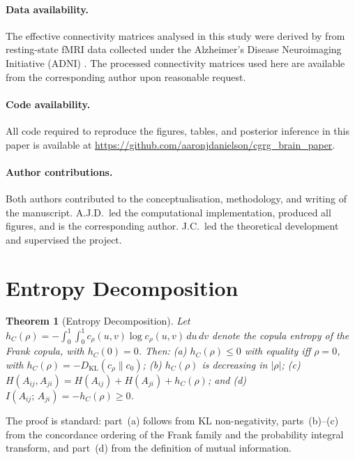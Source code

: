 \documentclass[12pt]{article}
\newtheorem{theorem}{Theorem}[section]
\begin{document}
\paragraph{Data availability.}
The effective connectivity matrices analysed in this study were derived by
\citet{nie2020} from resting-state fMRI data collected under the Alzheimer's
Disease Neuroimaging Initiative (ADNI) \citep{ma2019}.  The processed
connectivity matrices used here are available from the corresponding author
upon reasonable request.

\paragraph{Code availability.}
All code required to reproduce the figures, tables, and posterior inference
in this paper is available at
\url{https://github.com/aaronjdanielson/cgrg\_brain\_paper}.

\paragraph{Author contributions.}
Both authors contributed to the conceptualisation, methodology, and writing
of the manuscript.  A.J.D.\ led the computational implementation, produced
all figures, and is the corresponding author.  J.C.\ led the theoretical
development and supervised the project.

\appendix

\section{Entropy Decomposition}
\label{sec:appendix_entropy}

\begin{theorem}[Entropy Decomposition]
\label{thm:entropy}
Let $h_C(\rho) = -\int_0^1\!\int_0^1 c_\rho(u,v)\log c_\rho(u,v)\,du\,dv$
denote the \emph{copula entropy} of the Frank copula, with $h_C(0) = 0$.
Then: (a) $h_C(\rho) \leq 0$ with equality iff $\rho = 0$, with
$h_C(\rho) = -D_{\mathrm{KL}}(c_\rho \| c_0)$; (b) $h_C(\rho)$ is
decreasing in $|\rho|$; (c) $H(A_{ij}, A_{ji}) = H(A_{ij}) + H(A_{ji}) +
h_C(\rho)$; and (d) $I(A_{ij};\,A_{ji}) = -h_C(\rho) \geq 0$.
\end{theorem}

The proof is standard: part~(a) follows from KL non-negativity, parts~(b)--(c)
from the concordance ordering of the Frank family and the probability integral
transform, and part~(d) from the definition of mutual information.
\end{document}
